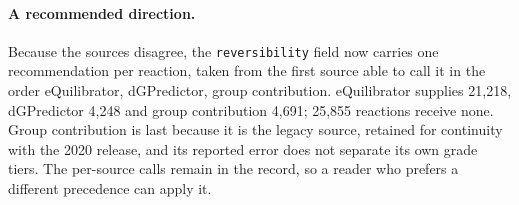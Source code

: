 \paragraph{A recommended direction.} Because the sources disagree, the
\texttt{reversibility} field now carries one recommendation per reaction, taken
from the first source able to call it in the order eQuilibrator, dGPredictor,
group contribution. eQuilibrator supplies 21,218, dGPredictor 4,248 and group
contribution 4,691; 25,855 reactions receive none. Group contribution is last
because it is the legacy source, retained for continuity with the 2020 release,
and its reported error does not separate its own grade tiers. The per-source
calls remain in the record, so a reader who prefers a different precedence can
apply it.
